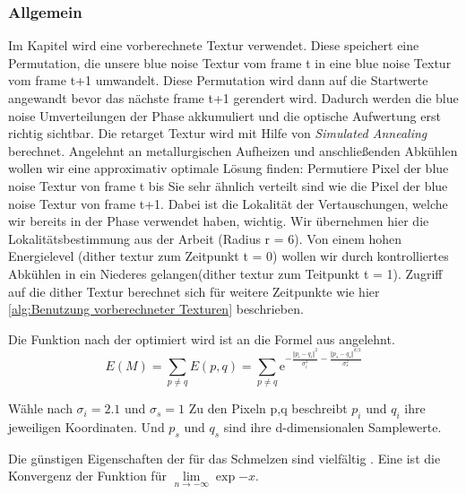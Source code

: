 \subsubsection{Allgemein}
Im Kapitel 
wird eine vorberechnete Textur verwendet. Diese speichert eine
Permutation, die unsere blue noise Textur vom frame t in eine
blue noise Textur vom frame t+1 umwandelt. Diese Permutation wird 
dann auf die Startwerte angewandt bevor das nächste frame t+1 gerendert wird.
Dadurch werden die blue noise Umverteilungen der  Phase
akkumuliert und die optische Aufwertung erst richtig sichtbar.
Die retarget Textur wird mit Hilfe von \textit{Simulated Annealing} 
\cite{hal02158423} berechnet. Angelehnt an metallurgischen Aufheizen und anschließenden Abkühlen wollen wir eine approximativ 
optimale Lösung finden: Permutiere Pixel der blue noise Textur von 
frame t bis Sie sehr ähnlich verteilt sind wie die Pixel der blue noise
Textur von frame t+1. Dabei ist die Lokalität der Vertauschungen, 
welche wir bereits in der  Phase
verwendet haben, wichtig. Wir übernehmen hier die Lokalitätsbestimmung aus 
der Arbeit \cite{hal02158423}(Radius r = 6). Von einem hohen Energielevel 
(dither textur zum Zeitpunkt t = 0) wollen wir durch kontrolliertes 
Abkühlen in ein Niederes gelangen(dither textur zum Teitpunkt t = 1).
Zugriff auf die dither Textur berechnet sich für weitere Zeitpunkte
wie hier \ref{alg:Benutzung vorberechneter Texturen} beschrieben.

Die Funktion nach der optimiert wird ist an die Formel aus\cite{georgiev2016blue} angelehnt.
\begin{equation}\label{eq:pixel energy function}
    E(M) = \sum_{p \neq q}E(p,q) = 
           \sum_{p \neq q} \mathrm{e}^{-\frac{\Vert{p_{i}-q_{i}}\Vert^{2}}{\sigma_{i}^{2}} -
           \frac{\Vert{p_{s}-q_{s}}\Vert^{d/2}}{\sigma_{s}^{2}}}
\end{equation}

Wähle nach \cite{ulichney1993void} $\sigma_{i} = 2.1$ und $\sigma_{s} = 1$ 
Zu den Pixeln p,q beschreibt $p_{i}$ und $q_{i}$ ihre jeweiligen Koordinaten.
Und $p_{s}$ und $q_{s}$ sind ihre d-dimensionalen Samplewerte.

Die günstigen Eigenschaften der  für das
Schmelzen sind vielfältig \cite{van1987simulated}. Eine ist die Konvergenz 
der Funktion für $\lim\limits_{n \rightarrow -\infty}{\exp{-x}}$.

